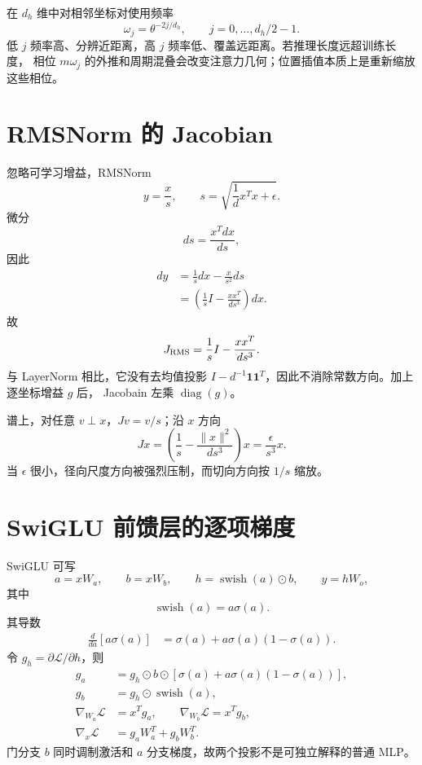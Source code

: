 \documentclass[11pt]{article}
\numberwithin{equation}{section}
\newcommand{\1}{\mathbf{1}}
\newcommand{\cL}{\mathcal{L}}
\newcommand{\diag}{\operatorname{diag}}
\begin{document}
在 $d_h$ 维中对相邻坐标对使用频率
\begin{equation}
 \omega_j=\theta^{-2j/d_h},\qquad j=0,\ldots,d_h/2-1.
\end{equation}
低 $j$ 频率高、分辨近距离，高 $j$ 频率低、覆盖远距离。若推理长度远超训练长度，
相位 $m\omega_j$ 的外推和周期混叠会改变注意力几何；位置插值本质上是重新缩放这些相位。

\section{RMSNorm 的 Jacobian}

忽略可学习增益，RMSNorm
\begin{equation}
 y=\frac{x}{s},\qquad
 s=\sqrt{\frac1d x^Tx+\epsilon}.
\end{equation}
微分
\begin{equation}
 ds=\frac{x^Tdx}{d s},
\end{equation}
因此
\begin{align}
 dy&=\frac1s dx-\frac{x}{s^2}ds\\
 &=\left(\frac1sI-\frac{xx^T}{d s^3}\right)dx.
\end{align}
故
\begin{equation}
 J_{\rm RMS}=\frac1sI-\frac{xx^T}{d s^3}.
\end{equation}
与 LayerNorm 相比，它没有去均值投影
$I-d^{-1}\1\1^T$，因此不消除常数方向。加上逐坐标增益 $g$ 后，
Jacobain 左乘 $\diag(g)$。

谱上，对任意 $v\perp x$，$Jv=v/s$；沿 $x$ 方向
\begin{equation}
 Jx=\left(\frac1s-\frac{\|x\|^2}{d s^3}\right)x
 =\frac{\epsilon}{s^3}x.
\end{equation}
当 $\epsilon$ 很小，径向尺度方向被强烈压制，而切向方向按 $1/s$ 缩放。

\section{SwiGLU 前馈层的逐项梯度}

SwiGLU 可写
\begin{equation}
 a=xW_a,\qquad b=xW_b,\qquad
 h=\operatorname{swish}(a)\odot b,\qquad
 y=hW_o,
\end{equation}
其中
\begin{equation}
 \operatorname{swish}(a)=a\sigma(a).
\end{equation}
其导数
\begin{align}
 \frac d{da}[a\sigma(a)]
 &=\sigma(a)+a\sigma(a)(1-\sigma(a)).
\end{align}
令 $g_h=\partial\cL/\partial h$，则
\begin{align}
 g_a&=g_h\odot b\odot
 [\sigma(a)+a\sigma(a)(1-\sigma(a))],\\
 g_b&=g_h\odot\operatorname{swish}(a),\\
 \nabla_{W_a}\cL&=x^Tg_a,\qquad
 \nabla_{W_b}\cL=x^Tg_b,\\
 \nabla_x\cL&=g_aW_a^T+g_bW_b^T.
\end{align}
门分支 $b$ 同时调制激活和 $a$ 分支梯度，故两个投影不是可独立解释的普通 MLP。
\end{document}
